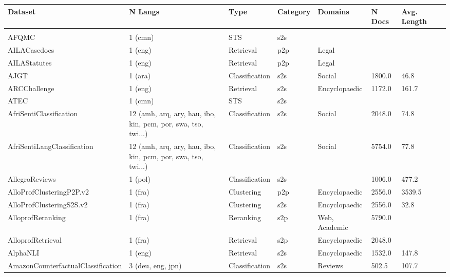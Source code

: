 \fontsize{9}{11}\selectfont
\onecolumn
\setlength\extrarowheight{7pt}
\begin{longtable}{L{5.0cm}|L{1.5cm}L{1.4cm}L{1.4cm}L{1.4cm}L{1.4cm}L{1.0cm}L{1.0cm}}
\toprule
\textbf{Dataset} & \textbf{N Langs} & \textbf{Type} & \textbf{Category} & \textbf{Domains} & \textbf{N Docs} & 
\textbf{Avg. Length} \\ 
\midrule
\endhead \\AFQMC \cite{raghu-etal-2021-end} & 1 (cmn) & STS & s2s &  &  &  \\
 \hline 
AILACasedocs \cite{paheli_bhattacharya_2020_4063986} & 1 (eng) & Retrieval & p2p & Legal &  &  \\
 \hline 
AILAStatutes \cite{paheli_bhattacharya_2020_4063986} & 1 (eng) & Retrieval & p2p & Legal &  &  \\
 \hline 
AJGT \cite{alomari2017arabic} & 1 (ara) & Classification & s2s & Social & 1800.0 & 46.8 \\
 \hline 
ARCChallenge \cite{xiao2024rar} & 1 (eng) & Retrieval & s2s & Encyclopaedic & 1172.0 & 161.7 \\
 \hline 
ATEC \cite{raghu-etal-2021-end} & 1 (cmn) & STS & s2s &  &  &  \\
 \hline 
AfriSentiClassification \cite{Muhammad2023AfriSentiAT} & 12 (amh, arq, ary, hau, ibo, kin, pcm, por, swa, tso, twi...) & Classification & s2s & Social & 2048.0 & 74.8 \\
 \hline 
AfriSentiLangClassification  & 12 (amh, arq, ary, hau, ibo, kin, pcm, por, swa, tso, twi...) & Classification & s2s & Social & 5754.0 & 77.8 \\
 \hline 
AllegroReviews  & 1 (pol) & Classification & s2s &  & 1006.0 & 477.2 \\
 \hline 
AlloProfClusteringP2P.v2 \cite{lef23} & 1 (fra) & Clustering & p2p & Encyclopaedic & 2556.0 & 3539.5 \\
 \hline 
AlloProfClusteringS2S.v2 \cite{lef23} & 1 (fra) & Clustering & s2s & Encyclopaedic & 2556.0 & 32.8 \\
 \hline 
AlloprofReranking \cite{lef23} & 1 (fra) & Reranking & s2p & Web, Academic & 5790.0 &  \\
 \hline 
AlloprofRetrieval \cite{lef23} & 1 (fra) & Retrieval & s2p & Encyclopaedic & 2048.0 &  \\
 \hline 
AlphaNLI \cite{xiao2024rar} & 1 (eng) & Retrieval & s2s & Encyclopaedic & 1532.0 & 147.8 \\
 \hline 
AmazonCounterfactualClassification \cite{oneill-etal-2021-wish} & 3 (deu, eng, jpn) & Classification & s2s & Reviews & 502.5 & 107.7 \\

\end{longtable}
